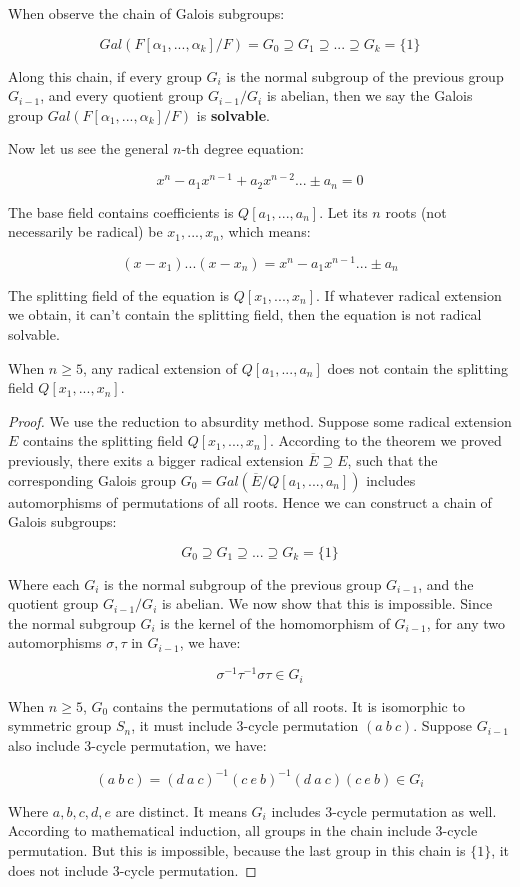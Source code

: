 \documentclass{article}
\begin{document}
When observe the chain of Galois subgroups:

\[
Gal(F[\alpha_1, ..., \alpha_k]/F) = G_0 \supseteq G_1 \supseteq ... \supseteq G_k = \{1\}
\]

Along this chain, if every group $G_i$ is the normal subgroup of the previous group $G_{i-1}$, and every quotient group $G_{i-1}/G_i$ is abelian, then we say the Galois group $Gal(F[\alpha_1, ..., \alpha_k]/F)$ is \textbf{solvable}.

Now let us see the general $n$-th degree equation:

\[
x^n - a_1x^{n-1} + a_2x^{n-2}... \pm a_n = 0
\]

The base field contains coefficients is $Q[a_1, ..., a_n]$. Let its $n$ roots (not necessarily be radical) be $x_1, ..., x_n$, which means:

\[
(x - x_1)...(x - x_n) = x^n - a_1x^{n-1} ... \pm a_n
\]

The splitting field of the equation is $Q[x_1, ..., x_n]$. If whatever radical extension we obtain, it can't contain the splitting field, then the equation is not radical solvable.

\begin{theorem}
When $n \geq 5$, any radical extension of $Q[a_1, ..., a_n]$ does not contain the splitting field $Q[x_1, ..., x_n]$.
\end{theorem}

\begin{proof}
We use the reduction to absurdity method. Suppose some radical extension $E$ contains the splitting field $Q[x_1, ..., x_n]$. According to the theorem we proved previously, there exits a bigger radical extension $\overline{E} \supseteq E$, such that the corresponding Galois group $G_0 = Gal(\overline{E}/Q[a_1, ..., a_n])$ includes automorphisms of permutations of all roots. Hence we can construct a chain of Galois subgroups:

\[
G_0 \supseteq G_1 \supseteq ... \supseteq G_k = \{1\}
\]

Where each $G_i$ is the normal subgroup of the previous group $G_{i-1}$, and the quotient group $G_{i-1}/G_i$ is abelian. We now show that this is impossible. Since the normal subgroup $G_i$ is the kernel of the homomorphism of $G_{i-1}$, for any two automorphisms $\sigma, \tau$ in $G_{i-1}$, we have:

\[
\sigma^{-1}\tau^{-1}\sigma\tau \in G_{i}
\]

When $n \geq 5$, $G_0$ contains the permutations of all roots. It is isomorphic to symmetric group $S_n$, it must include 3-cycle permutation $(a\ b\ c)$. Suppose $G_{i-1}$ also include 3-cycle permutation, we have:

\[
(a\ b\ c) = (d\ a\ c)^{-1}(c\ e\ b)^{-1}(d\ a\ c)(c\ e\ b) \in G_i
\]

Where $a, b, c, d, e$ are distinct. It means $G_i$ includes 3-cycle permutation as well. According to mathematical induction, all groups in the chain include 3-cycle permutation. But this is impossible, because the last group in this chain is $\{1\}$, it does not include 3-cycle permutation.
\end{proof}
\end{document}
